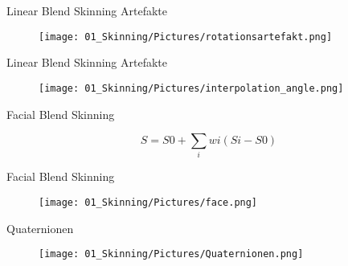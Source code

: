 		\begin{frame}{\Huge{Linear Blend Skinning Artefakte}}
			
			\begin{figure}
				\texttt{[image: 01\_Skinning/Pictures/rotationsartefakt.png]}
			\end{figure}
			
			
			
		\end{frame}
		
				\begin{frame}{\Huge{Linear Blend Skinning Artefakte}}
					
					\begin{figure}
						\texttt{[image: 01\_Skinning/Pictures/interpolation\_angle.png]}
					\end{figure}
					
					
					
				\end{frame}

	\begin{frame}{\Huge{Facial Blend Skinning}}

		
		$$S=S0+\sum_{i}wi(Si-S0)$$
		
		
	\end{frame}

				\begin{frame}{\Huge{Facial Blend Skinning}}
					
					\begin{figure}
						\texttt{[image: 01\_Skinning/Pictures/face.png]}
					\end{figure}
					
					
					
				\end{frame}

				\begin{frame}{\Huge{Quaternionen}}
					
					\begin{figure}
						\texttt{[image: 01\_Skinning/Pictures/Quaternionen.png]}
					\end{figure}
					
					
					
				\end{frame}
				
